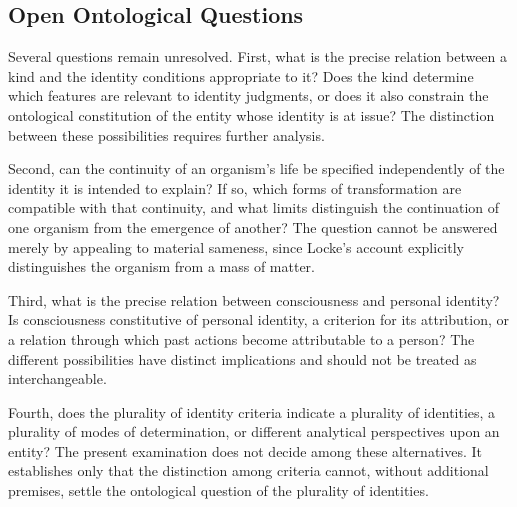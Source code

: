 \subsection{Open Ontological Questions}
\label{subsec:ch08-locke-open-questions}

\label{para:VS.B01.P01.C08.S08.SS15.P001}

Several questions remain unresolved. First, what
is the precise relation between a kind and the
identity conditions appropriate to it? Does
the kind determine which features are relevant
to identity judgments, or does it also constrain
the ontological constitution of the entity
whose identity is at issue? The distinction
between these possibilities requires further
analysis.

\label{para:VS.B01.P01.C08.S08.SS15.P002}

Second, can the continuity of an organism's life
be specified independently of the identity
it is intended to explain? If so, which forms
of transformation are compatible with that
continuity, and what limits distinguish the
continuation of one organism from the emergence
of another? The question cannot be answered
merely by appealing to material sameness, since
Locke's account explicitly distinguishes the
organism from a mass of matter.

\label{para:VS.B01.P01.C08.S08.SS15.P003}

Third, what is the precise relation between
consciousness and personal identity? Is
consciousness constitutive of personal identity,
a criterion for its attribution, or a relation
through which past actions become attributable
to a person? The different possibilities
have distinct implications and should not
be treated as interchangeable.

\label{para:VS.B01.P01.C08.S08.SS15.P004}

Fourth, does the plurality of identity criteria
indicate a plurality of identities, a plurality
of modes of determination, or different
analytical perspectives upon an entity? The
present examination does not decide among
these alternatives. It establishes only that
the distinction among criteria cannot, without
additional premises, settle the ontological
question of the plurality of identities.

\label{para:VS.B01.P01.C08.S08.SS15.P005}

